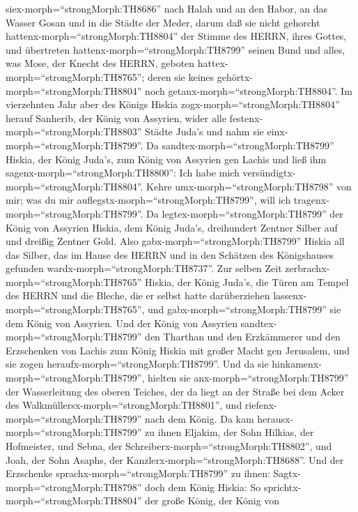 siex-morph=``strongMorph:TH8686'' nach Halah und an den Habor, an das
Wasser Gosan und in die Städte der Meder,  darum daß sie
nicht gehorcht hattenx-morph=``strongMorph:TH8804'' der Stimme des
HERRN, ihres Gottes, und übertreten hattenx-morph=``strongMorph:TH8799''
seinen Bund und alles, was Mose, der Knecht des HERRN, geboten
hattex-morph=``strongMorph:TH8765''; deren sie keines
gehörtx-morph=``strongMorph:TH8804'' noch
getanx-morph=``strongMorph:TH8804''.  Im vierzehnten Jahr
aber des Königs Hiskia zogx-morph=``strongMorph:TH8804'' herauf
Sanherib, der König von Assyrien, wider alle
festenx-morph=``strongMorph:TH8803'' Städte Juda's und nahm sie
einx-morph=``strongMorph:TH8799''.  Da
sandtex-morph=``strongMorph:TH8799'' Hiskia, der König Juda's, zum König
von Assyrien gen Lachis und ließ ihm
sagenx-morph=``strongMorph:TH8800'': Ich habe mich
versündigtx-morph=``strongMorph:TH8804''. Kehre
umx-morph=``strongMorph:TH8798'' von mir; was du mir
auflegstx-morph=``strongMorph:TH8799'', will ich
tragenx-morph=``strongMorph:TH8799''. Da
legtex-morph=``strongMorph:TH8799'' der König von Assyrien Hiskia, dem
König Juda's, dreihundert Zentner Silber auf und dreißig Zentner Gold.
 Also gabx-morph=``strongMorph:TH8799'' Hiskia all das
Silber, das im Hause des HERRN und in den Schätzen des Königshauses
gefunden wardx-morph=``strongMorph:TH8737''.  Zur selben
Zeit zerbrachx-morph=``strongMorph:TH8765'' Hiskia, der König Juda's,
die Türen am Tempel des HERRN und die Bleche, die er selbst hatte
darüberziehen lassenx-morph=``strongMorph:TH8765'', und
gabx-morph=``strongMorph:TH8799'' sie dem König von Assyrien.
 Und der König von Assyrien
sandtex-morph=``strongMorph:TH8799'' den Tharthan und den Erzkämmerer
und den Erzschenken von Lachis zum König Hiskia mit großer Macht gen
Jerusalem, und sie zogen heraufx-morph=``strongMorph:TH8799''. Und da
sie hinkamenx-morph=``strongMorph:TH8799'', hielten sie
anx-morph=``strongMorph:TH8799'' der Wasserleitung des oberen Teiches,
der da liegt an der Straße bei dem Acker des
Walkmüllersx-morph=``strongMorph:TH8801'',  und
riefenx-morph=``strongMorph:TH8799'' nach dem König. Da kam
herausx-morph=``strongMorph:TH8799'' zu ihnen Eljakim, der Sohn Hilkias,
der Hofmeister, und Sebna, der Schreiberx-morph=``strongMorph:TH8802'',
und Joah, der Sohn Asaphs, der Kanzlerx-morph=``strongMorph:TH8688''.
 Und der Erzschenke sprachx-morph=``strongMorph:TH8799'' zu
ihnen: Sagtx-morph=``strongMorph:TH8798'' doch dem König Hiskia: So
sprichtx-morph=``strongMorph:TH8804'' der große König, der König von
